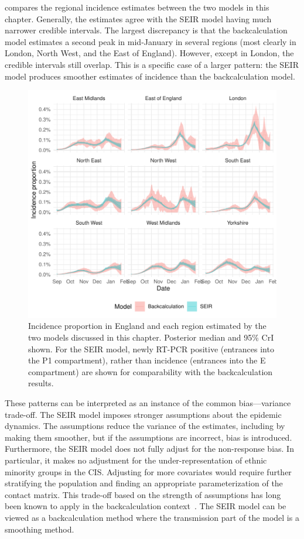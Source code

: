 \documentclass[thesis.tex]{subfiles}
\begin{document}
 compares the regional incidence estimates between the two models in this chapter.
Generally, the estimates agree with the SEIR model having much narrower credible intervals.
The largest discrepancy is that the backcalculation model estimates a second peak in mid-January in several regions (most clearly in London, North West, and the East of England).
However, except in London, the credible intervals still overlap.
This is a specific case of a larger pattern: the SEIR model produces smoother estimates of incidence than the backcalculation model.
\begin{figure}
    \centering \includegraphics{transmission/compare-regions}
    \caption[Comparing each models estimate of regional incidence.]{%
        Incidence proportion in England and each region estimated by the two models discussed in this chapter.
        Posterior median and 95\% CrI shown.
        For the SEIR model, newly RT-PCR positive (entrances into the P1 compartment), rather than incidence (entrances into the E compartment) are shown for comparability with the backcalculation results.
    }
    \label{transmission:fig:compare-regions}
\end{figure}

These patterns can be interpreted as an instance of the common bias---variance trade-off.
The SEIR model imposes stronger assumptions about the epidemic dynamics.
The assumptions reduce the variance of the estimates, including by making them smoother, but if the assumptions are incorrect, bias is introduced.
Furthermore, the SEIR model does not fully adjust for the non-response bias.
In particular, it makes no adjustment for the under-representation of ethnic minority groups in the CIS.
Adjusting for more covariates would require further stratifying the population and finding an appropriate parameterization of the contact matrix.
This trade-off based on the strength of assumptions has long been known to apply in the backcalculation context~\autocite[e.g.][section 8.3]{brookmeyerBackcalculation}.
The SEIR model can be viewed as a backcalculation method where the transmission part of the model is a smoothing method.
\end{document}
